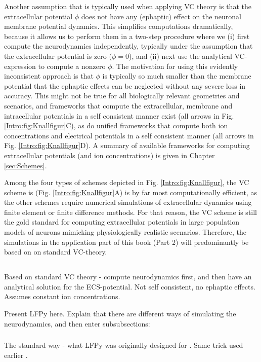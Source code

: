Another assumption that is typically used when applying VC theory is that the extracellular potential $\phi$ does not have any (ephaptic) effect on the neuronal membrane potential dynamics. This simplifies computations dramatically, because it allows us to perform them in a two-step procedure where we (i) first compute the neurodynamics independently, typically under the assumption that the extracellular potential is zero ($\phi = 0$), and (ii) next use the analytical VC-expression to compute a nonzero $\phi$. The motivation for using this evidently inconsistent approach is that $\phi$ is typically so much smaller than the membrane potential that the ephaptic effects can be neglected without any severe loss in accuracy. This might not be true for all biologically relevant geometries and scenarios, and frameworks that compute the extracellular, membrane and intracellular potentials in a self consistent manner exist (all arrows in Fig. \ref{Intro:fig:Knallfigur}C), as do unified frameworks that compute both ion concentrations and electrical potentials in a self consistent manner (all arrows in Fig. \ref{Intro:fig:Knallfigur}D). A summary of available frameworks for computing extracellular potentials (and ion concentrations) is given in Chapter \ref{sec:Schemes}.

Among the four types of schemes depicted in Fig. \ref{Intro:fig:Knallfigur}, the VC scheme is (Fig. \ref{Intro:fig:Knallfigur}A) is by far most computationally efficient, as the other schemes require numerical simulations of extracellular dynamics using finite element or finite difference methods. For that reason, the VC scheme is still the gold standard for computing extracellular potentials in large population models of neurons mimicking physiologically realistic scenarios. Therefore, the simulations in the application part of this book (Part 2) will predominantly be based on on standard VC-theory.

\subsection{}
Based on standard VC theory - compute neurodynamics first, and then have an analytical solution for the ECS-potential.
Not self consistent, no ephaptic effects. Assumes constant ion concentrations.

Present LFPy here. Explain that there are different ways of simulating the neurodynamics, and then enter subsubsections: 

\subsubsection{}
The standard way - what LFPy was originally designed for \cite{Hagen2018}.
Same trick used earlier \citep{Holt1999}.


